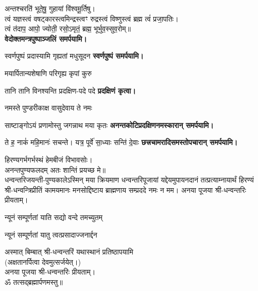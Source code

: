 \begin{center}
अन्तश्चरति॑ भूते॒षु॒ गुहायां वि॑श्वमू॒र्तिषु। \\
त्वं यज्ञस्त्वं वषट्कारस्त्वमिन्द्रस्त्वꣳ रुद्रस्त्वं विष्णुस्त्वं ब्रह्म त्वं॑ प्रजा॒पतिः। \\
त्वं त॑दाप॒ आपो॒ ज्योती॒ रसो॒ऽमृतं॒ ब्रह्म॒ भूर्भुव॒स्सुव॒रोम्‌॥\\

\textbf{\devAya{} वेदोक्तमन्त्रपुष्पाञ्जलिं समर्पयामि।}
\medskip

{स्वर्णपुष्पं प्रदास्यामि गृह्यतां मधुसूदन}
\textbf{\devAya{} स्वर्णपुष्पं समर्पयामि।}
\medskip

{मयार्पितान्यशेषाणि परिगृह्य कृपां कुरु}


{तानि तानि विनश्यन्ति प्रदक्षिण-पदे पदे}
\textbf{प्रदक्षिणं कृत्वा।}
\medskip

{नमस्ते पुण्डरीकाक्ष वासुदेवाय ते नमः}

{साष्टाङ्गोऽयं प्रणामोस्तु जगन्नाथ मया कृतः}
\textbf{\devAya{} अनन्तकोटिप्रदक्षिणनमस्कारान् समर्पयामि।}
 \medskip

{ते ह॒ नाकं॑ महि॒मानः॑ सचन्ते। यत्र॒ पूर्वे॑ सा॒ध्याः सन्ति॑ दे॒वाः}
\textbf{\devAya{} छत्त्रचामरादिसमस्तोपचारान् समर्पयामि।}
\medskip

हिरण्यगर्भगर्भस्थं हेमबीजं विभावसोः।\\
अनन्तपुण्यफलदम् अतः शान्तिं प्रयच्छ मे॥\\

धन्वन्तरिजयन्ती-पुण्यकालेऽस्मिन् मया क्रियमाण धन्वन्तरिपूजायां यद्देयमुपायनदानं तत्प्रत्याम्नायार्थं
हिरण्यं श्री-धन्वन्त्रिप्रीतिं 
कामयमानः मनसोद्दिष्टाय ब्राह्मणाय सम्प्रददे नमः न मम। 
अनया पूजया श्री-धन्वन्तरिः प्रीयताम्। 

{न्यूनं सम्पूर्णतां याति सद्यो वन्दे तमच्युतम्}

{न्यूनं सम्पूर्णतां यातु त्वत्प्रसादाज्जनार्द्दन}

अस्मात् बिम्बात् श्री-धन्वन्तरिं यथास्थानं प्रतिष्ठापयामि\\
(अक्षतानर्पित्वा देवमुत्सर्जयेत्।)\\
अनया पूजया श्री-धन्वन्तरिः प्रीयताम्।\\

ॐ तत्सद्ब्रह्मार्पणमस्तु॥



\closesection

\end{center}